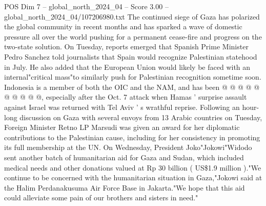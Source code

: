 \begin{textsample}{POS Dim 7 – global\_north\_2024\_04 – Score 3.00 – global\_north\_2024\_04/107206980.txt}
The continued siege of Gaza has polarized the global community in recent months and has sparked a wave of domestic pressure all over the world pushing for a permanent cease-fire and progress on the two-state solution.
On Tuesday, reports emerged that Spanish Prime Minister Pedro Sanchez told journalists that Spain would recognize Palestinian statehood in July.
He also added that the European Union would likely be faced with an internal"critical mass"to similarly push for Palestinian recognition sometime soon.
Indonesia is a member of both the OIC and the NAM, and has been @ @ @ @ @ @ @ @ @ @, especially after the Oct. 7 attack when Hamas ' surprise assault against Israel was returned with Tel Aviv ' s wrathful reprise.
Following an hour-long discussion on Gaza with several envoys from 13 Arabic countries on Tuesday, Foreign Minister Retno LP Marsudi was given an award for her diplomatic contributions to the Palestinian cause, including for her consistency in promoting its full membership at the UN.
On Wednesday, President Joko"Jokowi"Widodo sent another batch of humanitarian aid for Gaza and Sudan, which included medical needs and other donations valued at Rp 30 billion ( US\$1.9 million )."We continue to be concerned with the humanitarian situation in Gaza,"Jokowi said at the Halim Perdanakusuma Air Force Base in Jakarta."We hope that this aid could alleviate some pain of our brothers and sisters in need."

\end{textsample}
